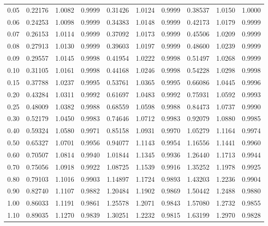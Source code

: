 {\begin{longtable}{|||j{3.2}|X|X|X|||}
0.05   & 0.22176  & 1.0082  & 0.9999  & 0.31426   & 1.0124  & 0.9999  & 0.38537  & 1.0150  & 1.0000 \\  
0.06   & 0.24253  & 1.0098  & 0.9999  & 0.34383   & 1.0148  & 0.9999  & 0.42173  & 1.0179  & 0.9999 \\   
0.07   & 0.26153  & 1.0114  & 0.9999  & 0.37092   & 1.0173  & 0.9999  & 0.45506  & 1.0209  & 0.9999 \\  
0.08   & 0.27913  & 1.0130  & 0.9999  & 0.39603   & 1.0197  & 0.9999  & 0.48600  & 1.0239  & 0.9999 \\  
0.09   & 0.29557  & 1.0145  & 0.9998  & 0.41954   & 1.0222  & 0.9998  & 0.51497  & 1.0268  & 0.9999 \\  
0.10   & 0.31105  & 1.0161  & 0.9998  & 0.44168   & 1.0246  & 0.9998  & 0.54228  & 1.0298  & 0.9998 \\[6pt]   
%
0.15   & 0.37788  & 1.0237  & 0.9995  & 0.53761   & 1.0365  & 0.9995  & 0.66086  & 1.0445  & 0.9996 \\*  
0.20   & 0.43284  & 1.0311  & 0.9992  & 0.61697   & 1.0483  & 0.9992  & 0.75931  & 1.0592  & 0.9993 \\  
0.25   & 0.48009  & 1.0382  & 0.9988  & 0.68559   & 1.0598  & 0.9988  & 0.84473  & 1.0737  & 0.9990 \\  
0.30   & 0.52179  & 1.0450  & 0.9983  & 0.74646   & 1.0712  & 0.9983  & 0.92079  & 1.0880  & 0.9985 \\  
0.40   & 0.59324  & 1.0580  & 0.9971  & 0.85158   & 1.0931  & 0.9970  & 1.05279  & 1.1164  & 0.9974 \\  
0.50   & 0.65327  & 1.0701  & 0.9956  & 0.94077   & 1.1143  & 0.9954  & 1.16556  & 1.1441  & 0.9960 \\ 
0.60   & 0.70507  & 1.0814  & 0.9940  & 1.01844   & 1.1345  & 0.9936  & 1.26440  & 1.1713  & 0.9944 \\  
0.70   & 0.75056  & 1.0918  & 0.9922  & 1.08725   & 1.1539  & 0.9916  & 1.35252  & 1.1978  & 0.9925 \\  
0.80   & 0.79103  & 1.1016  & 0.9903  & 1.14897   & 1.1724  & 0.9893  & 1.43203  & 1.2236  & 0.9904 \\  
0.90   & 0.82740  & 1.1107  & 0.9882  & 1.20484   & 1.1902  & 0.9869  & 1.50442  & 1.2488  & 0.9880 \\[6pt]  
%
1.00   & 0.86033  & 1.1191  & 0.9861  & 1.25578   & 1.2071  & 0.9843  & 1.57080  & 1.2732  & 0.9855 \\* 
1.10   & 0.89035  & 1.1270  & 0.9839  & 1.30251   & 1.2232  & 0.9815  & 1.63199  & 1.2970  & 0.9828 \\  

\end{longtable}}

